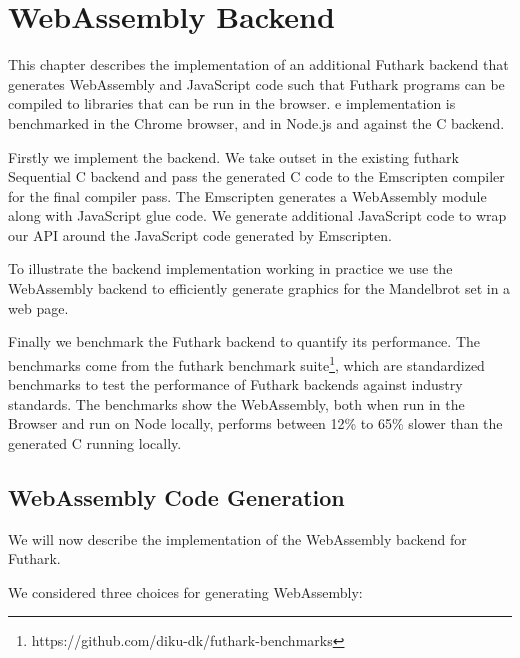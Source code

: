 \documentclass[11pt]{book}
\begin{document}
\chapter{WebAssembly Backend}

This chapter describes the implementation of an additional Futhark backend that generates WebAssembly and JavaScript code such that Futhark programs can be compiled to libraries that can be run in the browser. e implementation is benchmarked in the Chrome browser, and in Node.js and against the C backend.




Firstly we implement the backend. We take outset in the existing futhark Sequential C backend and pass the generated C code to the Emscripten compiler for the final compiler pass. The Emscripten generates a WebAssembly module along with JavaScript glue code. We generate additional JavaScript code to wrap our API around the JavaScript code generated by Emscripten.

To illustrate the backend implementation working in practice we use the WebAssembly backend to efficiently generate graphics for the Mandelbrot set in a web page.

Finally we benchmark the Futhark backend to quantify its performance. The benchmarks come from the futhark benchmark suite\footnote{https://github.com/diku-dk/futhark-benchmarks}, which are standardized benchmarks to test the performance of Futhark backends against industry standards. The benchmarks show the WebAssembly, both when run in the Browser and run on Node locally, performs between 12\% to 65\% slower than the generated C running locally. 

\section{WebAssembly Code Generation}

We will now describe the implementation of the WebAssembly backend for Futhark.

We considered three choices for generating WebAssembly:
\end{document}
